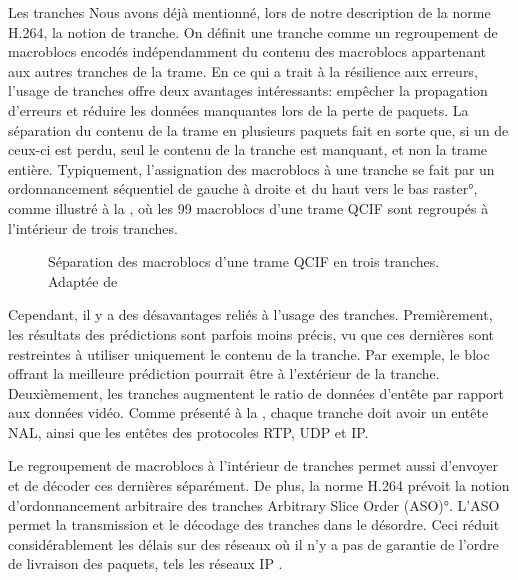 \begin{section}{Les tranches}
\label{sect-tranche}
Nous avons déjà mentionné, lors de notre description de la norme H.264, la
notion de tranche. On définit une tranche comme un regroupement de macroblocs
encodés indépendamment du contenu des macroblocs appartenant aux autres tranches
de la trame. En ce qui a trait à la résilience aux erreurs, l'usage de tranches
offre deux avantages intéressants: empêcher la propagation d'erreurs et réduire
les données manquantes lors de la perte de paquets. La séparation du contenu de
la trame en plusieurs paquets fait en sorte que, si un de ceux-ci est perdu,
seul le contenu de la tranche est manquant, et non la trame entière.
Typiquement, l'assignation des macroblocs à une tranche se fait par un
ordonnancement séquentiel de gauche à droite et du haut vers le bas
\ang{raster}, comme illustré à la , où les 99 macroblocs d'une
trame QCIF sont regroupés à l'intérieur de trois tranches.

\begin{figure}
	\centering
	
	\caption[Séparation des macroblocs d'une trame QCIF en trois tranches] 
	{Séparation des macroblocs d'une trame QCIF en trois tranches.\\Adaptée de \citet[p.~556]{Wiegand2003}}
	\label{fig-Tranches}
\end{figure}

Cependant, il y a des désavantages reliés à l'usage des tranches. Premièrement,
les résultats des prédictions sont parfois moins précis, vu que ces dernières
sont restreintes à utiliser uniquement le contenu de la tranche. Par exemple, le
bloc offrant la meilleure prédiction pourrait être à l'extérieur de la tranche.
Deuxièmement, les tranches augmentent le ratio de données d'entête par rapport
aux données vidéo. Comme présenté à la  , chaque
tranche doit avoir un entête NAL, ainsi que les entêtes des protocoles RTP, UDP
et IP.

Le regroupement de macroblocs à l'intérieur de tranches permet aussi d'envoyer
et de décoder ces dernières séparément. De plus, la norme H.264 prévoit la
notion d'ordonnancement arbitraire des tranches \ang{Arbitrary Slice Order (ASO)}.
L'ASO permet la transmission et le décodage des tranches dans le désordre. Ceci
réduit considérablement les délais sur des réseaux où il n'y a pas de garantie
de l'ordre de livraison des paquets, tels les réseaux IP \citep{sullivan2005}.
\end{section}

